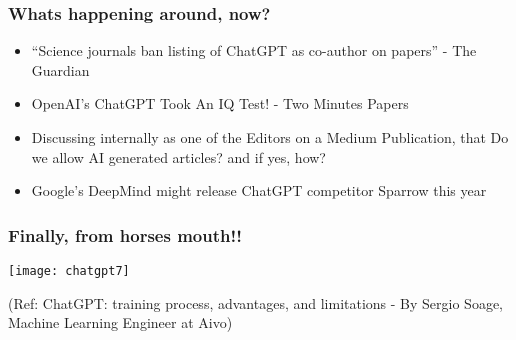 \begin{frame}[fragile]\frametitle{Whats happening around, now?}


\begin{itemize}
\item ``Science journals ban listing of ChatGPT as co-author on papers'' - The Guardian
\item OpenAI’s ChatGPT Took An IQ Test! - Two Minutes Papers
\item Discussing internally as one of the Editors on a Medium Publication, that Do we allow AI generated articles? and if yes, how?
\item Google’s DeepMind might release ChatGPT competitor Sparrow this year
\end{itemize}	 

\end{frame}

\begin{frame}[fragile]\frametitle{Finally, from horses mouth!!}


\begin{center}
\texttt{[image: chatgpt7]}
\end{center}		

{\tiny (Ref: ChatGPT: training process, advantages, and limitations - By Sergio Soage, Machine Learning Engineer at Aivo)}
			

\end{frame}

